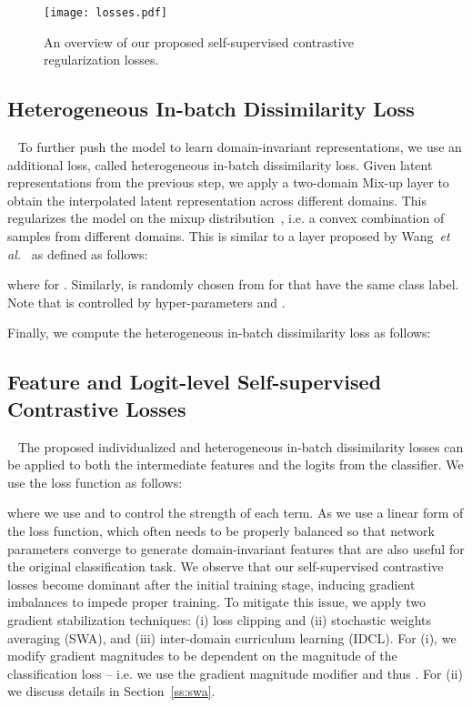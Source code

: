 \documentclass[10pt,twocolumn,letterpaper]{article}
\renewcommand{\etal}{\textit{et al.}}
\begin{document}
\begin{figure}[t]
\begin{center}
   \texttt{[image: losses.pdf]}
\end{center}
   \caption{An overview of our proposed self-supervised contrastive regularization losses.}
\label{fig:losses}\end{figure}

\subsection{Heterogeneous In-batch Dissimilarity Loss}~\label{ss:hdl}
To further push the model to learn domain-invariant representations, we use an additional loss, called heterogeneous in-batch dissimilarity loss. Given latent representations  from the previous step, we apply a two-domain Mix-up layer to obtain the interpolated latent representation  across different domains. This regularizes the model on the mixup distribution~\cite{zhang2017mixup}, i.e. a convex combination of samples from different domains. This is similar to a layer proposed by Wang~\etal~\cite{wang2020heterogeneous} as defined as follows:

where  for . Similarly,  is randomly chosen from  for  that have the same class label. Note that  is controlled by hyper-parameters  and .

Finally, we compute the heterogeneous in-batch dissimilarity loss  as follows:


\subsection{Feature and Logit-level Self-supervised Contrastive Losses}~\label{ss:losses}
The proposed individualized and heterogeneous in-batch dissimilarity losses can be applied to both the intermediate features and the logits from the classifier. We use the loss function  as follows:

where we use  and  to control the strength of each term. As we use a linear form of the loss function, which often needs to be properly balanced so that network parameters converge to generate domain-invariant features that are also useful for the original classification task. We observe that our self-supervised contrastive losses  become dominant after the initial training stage, inducing gradient imbalances to impede proper training. 
To mitigate this issue, we apply two gradient stabilization techniques: (i) loss clipping and (ii) stochastic weights averaging (SWA), and (iii) inter-domain curriculum learning (IDCL). For (i), we modify gradient magnitudes to be dependent on the magnitude of the classification loss  -- i.e. we use the gradient magnitude modifier  and thus . For (ii) we discuss details in Section~\ref{ss:swa}.
\end{document}
